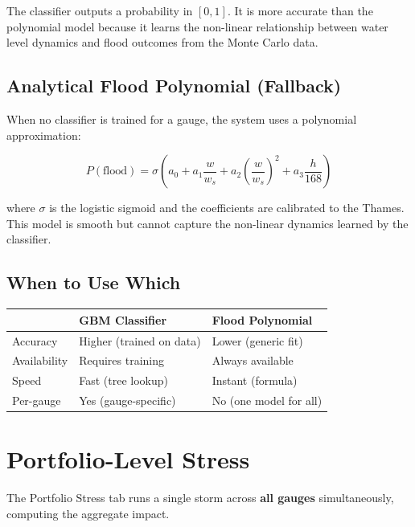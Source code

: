 \documentclass[11pt,a4paper]{article}
\begin{document}
\noindent The classifier outputs a probability in $[0, 1]$.  It is
more accurate than the polynomial model because it learns the
non-linear relationship between water level dynamics and flood
outcomes from the Monte Carlo data.

\subsection{Analytical Flood Polynomial (Fallback)}

When no classifier is trained for a gauge, the system uses a
polynomial approximation:

\[
  P(\text{flood}) = \sigma\!\left(
    a_0 + a_1 \frac{w}{w_s} + a_2 \left(\frac{w}{w_s}\right)^2
    + a_3 \frac{h}{168}
  \right)
\]

\noindent where $\sigma$ is the logistic sigmoid and the coefficients
are calibrated to the Thames.  This model is smooth but cannot capture
the non-linear dynamics learned by the classifier.

\subsection{When to Use Which}

\begin{center}
\begin{tabular}{lll}
\toprule
& \textbf{GBM Classifier} & \textbf{Flood Polynomial} \\
\midrule
Accuracy     & Higher (trained on data) & Lower (generic fit) \\
Availability & Requires training        & Always available \\
Speed        & Fast (tree lookup)       & Instant (formula) \\
Per-gauge    & Yes (gauge-specific)     & No (one model for all) \\
\bottomrule
\end{tabular}
\end{center}


\section{Portfolio-Level Stress}

The Portfolio Stress tab runs a single storm across \textbf{all gauges}
simultaneously, computing the aggregate impact.
\end{document}
